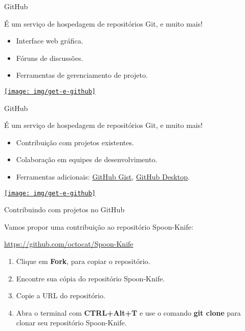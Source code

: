 \documentclass[a4paper]{beamer}
\begin{document}
\begin{frame}{GitHub}

É um serviço de hospedagem de repositórios Git, e muito mais!

\begin{itemize}
\item Interface web gráfica.
\item Fóruns de discussões.
\item Ferramentas de gerenciamento de projeto.
\end{itemize}

\begin{center}
\href{https://github.com/}{\texttt{[image: img/get-e-github]}}
\end{center}

\end{frame}

\begin{frame}{GitHub}

É um serviço de hospedagem de repositórios Git, e muito mais!

\begin{itemize}
\item Contribuição com projetos existentes.
\item Colaboração em equipes de desenvolvimento.
\item Ferramentas adicionais: \href{https://gist.github.com/}{GitHub Gist}, \href{https://desktop.github.com/}{GitHub Desktop}.
\end{itemize}

\begin{center}
\href{https://github.com/}{\texttt{[image: img/get-e-github]}}
\end{center}

\end{frame}

\begin{frame}{Contribuindo com projetos no GitHub}

Vamos propor uma contribuição ao repositório Spoon-Knife:
\begin{center}
\url{https://github.com/octocat/Spoon-Knife}
\end{center}

\begin{enumerate}
\item Clique em \textbf{Fork}, para copiar o repositório.
\item Encontre sua cópia do repositório Spoon-Knife.
\item Copie a URL do repositório.
\item Abra o terminal com \textbf{CTRL+Alt+T} e use o comando \textbf{git clone} para clonar seu repositório Spoon-Knife.
\end{enumerate}

\end{frame}
\end{document}
